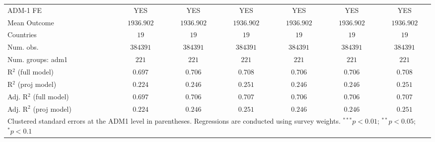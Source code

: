 \begin{table}[htbp]
\begin{center}
\begin{tabular}{l c c c c c c}
ADM-1 FE                & YES           & YES           & YES           & YES           & YES           & YES           \\
Mean Outcome            & $1936.902$    & $1936.902$    & $1936.902$    & $1936.902$    & $1936.902$    & $1936.902$    \\
Countries               & $19$          & $19$          & $19$          & $19$          & $19$          & $19$          \\
Num. obs.               & $384391$      & $384391$      & $384391$      & $384391$      & $384391$      & $384391$      \\
Num. groups: adm1       & $221$         & $221$         & $221$         & $221$         & $221$         & $221$         \\
R$^2$ (full model)      & $0.697$       & $0.706$       & $0.708$       & $0.706$       & $0.706$       & $0.708$       \\
R$^2$ (proj model)      & $0.224$       & $0.246$       & $0.251$       & $0.246$       & $0.246$       & $0.251$       \\
Adj. R$^2$ (full model) & $0.697$       & $0.706$       & $0.707$       & $0.706$       & $0.706$       & $0.707$       \\
Adj. R$^2$ (proj model) & $0.224$       & $0.246$       & $0.251$       & $0.246$       & $0.246$       & $0.251$       \\
\hline
\multicolumn{7}{l}{\scriptsize{Clustered standard errors at the ADM1 level in parentheses. Regressions are conducted using survey weights. $^{***}p<0.01$; $^{**}p<0.05$; $^{*}p<0.1$}}
\end{tabular}
\label{main: tableA8}
\end{center}
\end{table}
